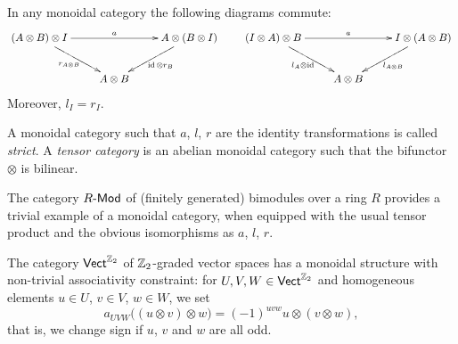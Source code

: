 \begin{proposition}
  In any monoidal category the following diagrams commute:
  \begin{equation*}
    \xymatrix{%
      (A\otimes B)\otimes I
      &
      &
      A\otimes(B\otimes I)
      \\
      &
      A\otimes B
      &
      \ar "1,1";"1,3"^{a}
      \ar "1,1";"2,2"_{r_{A\otimes B}}
      \ar "1,3";"2,2"^{\id \otimes r_B}
      }      
    \qquad
    \xymatrix{%
      (I\otimes A)\otimes B
      &
      &
      I\otimes(A\otimes B)
      \\
      &
      A\otimes B
      &
      \ar "1,1";"1,3"^{a}
      \ar "1,1";"2,2"_{l_A \otimes \id}
      \ar "1,3";"2,2"^{l_{A\otimes B}}
      }
  \end{equation*}
  Moreover, $l_I = r_I$.
\end{proposition}

A monoidal category such that $a$, $l$, $r$ are the identity
transformations is called \emph{strict}. A \emph{tensor category} is
an abelian monoidal category such that the bifunctor $\otimes$ is bilinear.

\begin{example}
  The category $R\text{-}\mathsf{Mod}$ of (finitely generated) bimodules
  over a ring $R$ provides a trivial example of a monoidal category,
  when equipped with the usual tensor product and the obvious
  isomorphisms as $a$, $l$, $r$.
\end{example}

\begin{example} The category $\mathsf{Vect}_{}^{\mathbb{Z}_2}$ of
  $\mathbb{Z}_2$-graded vector spaces has a monoidal structure with
  non-trivial associativity constraint: for $U, V, W \in
  \mathsf{Vect}_{}^{\mathbb{Z}_2}$ and homogeneous elements $u \in U$, $v \in V$, $w \in
  W$, we set
  \begin{equation*}
    a_{UVW} \bigl( (u \otimes v) \otimes w \bigr) = (-1)^{uvw} u \otimes (v\otimes w),
  \end{equation*}
  that is, we change sign if $u$, $v$ and $w$ are all odd.
\end{example}

